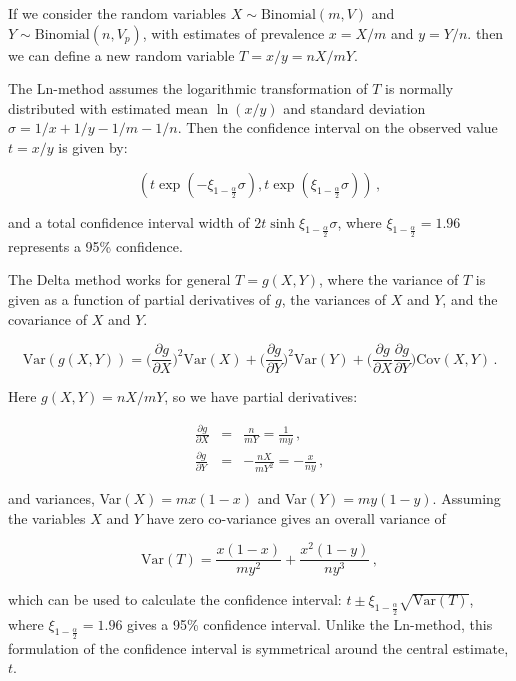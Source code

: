 If we consider the random variables $X \sim \mbox{Binomial}(m,V)$ and  $Y \sim \mbox{Binomial}(n,V_p)$, with estimates of prevalence $x=X/m$ and $y=Y/n$. then we can define a new random variable $T=x/y=nX/mY$.

The Ln-method assumes the logarithmic transformation of $T$ is normally distributed with estimated mean $\ln{(x/y)}$ and standard deviation $\sigma=1/x +1/y -1/m-1/n$. Then the confidence interval on the observed value $t=x/y$ is given by:

\begin{equation}
    (t\exp(-\xi_{1-\frac{\alpha}{2}}\sigma), t\exp(\xi_{1-\frac{\alpha}{2}}\sigma))\,,
\end{equation}

and a total confidence interval width of $2t\sinh{\xi_{1-\frac{\alpha}{2}}\sigma}$, where $\xi_{1-\frac{\alpha}{2}}=1.96$ represents a 95\% confidence. 

The Delta method works for general $T = g(X,Y)$, where the variance of $T$ is given as a function of partial derivatives of $g$, the variances of $X$ and $Y$, and the covariance of $X$ and $Y$.

\begin{equation}
    \mbox{Var}(g(X,Y)) = \Bigg(\frac{\partial g}{\partial X}\Bigg)^2\mbox{Var}(X) + \Bigg(\frac{\partial g}{\partial Y}\Bigg)^2\mbox{Var}(Y) + \Bigg(\frac{\partial g}{\partial X}\frac{\partial g}{\partial Y}\Bigg)\mbox{Cov}(X,Y)\,.
\end{equation}

Here $g(X,Y)=nX/mY$, so we have partial derivatives:

\begin{eqnarray}
    \frac{\partial g}{\partial X} &=& \frac{n}{mY} = \frac{1}{my}\,,\\
    \frac{\partial g}{\partial Y} &=& -\frac{nX}{mY^2} = -\frac{x}{ny}\,,
\end{eqnarray}

and variances, Var$(X)= mx(1-x)$ and Var$(Y)= my(1-y)$. Assuming the variables $X$ and $Y$ have zero co-variance gives an overall variance of

\begin{equation}
    \mbox{Var}(T) = \frac{x(1-x)}{my^2} + \frac{x^2(1-y)}{ny^3}\,,
\end{equation}

which can be used to calculate the confidence interval: $t \pm \xi_{1-\frac{\alpha}{2}}\sqrt{\mbox{Var}(T)}$, where $\xi_{1-\frac{\alpha}{2}}=1.96$ gives a 95\% confidence interval. Unlike the Ln-method, this formulation of the confidence interval is symmetrical around the central estimate, $t$. 


